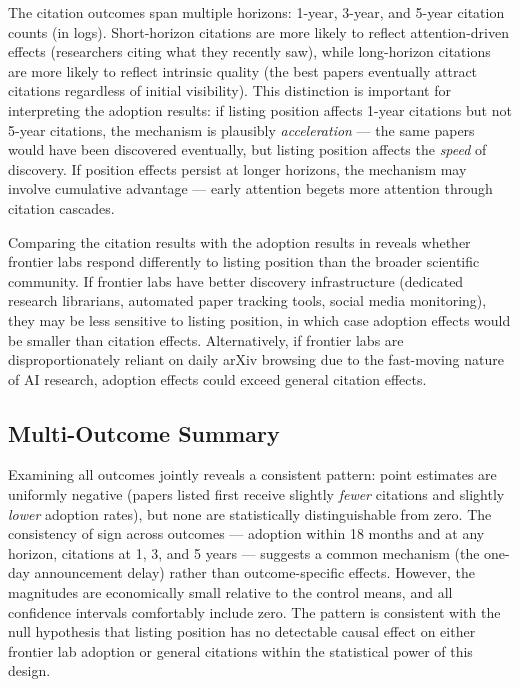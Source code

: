 \documentclass[12pt]{article}
\begin{document}
  


The citation outcomes span multiple horizons: 1-year, 3-year, and 5-year citation counts (in logs). Short-horizon citations are more likely to reflect attention-driven effects (researchers citing what they recently saw), while long-horizon citations are more likely to reflect intrinsic quality (the best papers eventually attract citations regardless of initial visibility). This distinction is important for interpreting the adoption results: if listing position affects 1-year citations but not 5-year citations, the mechanism is plausibly \textit{acceleration} --- the same papers would have been discovered eventually, but listing position affects the \textit{speed} of discovery. If position effects persist at longer horizons, the mechanism may involve cumulative advantage \citep{wang2013, sinatra2016} --- early attention begets more attention through citation cascades.

Comparing the citation results with the adoption results in  reveals whether frontier labs respond differently to listing position than the broader scientific community. If frontier labs have better discovery infrastructure (dedicated research librarians, automated paper tracking tools, social media monitoring), they may be less sensitive to listing position, in which case adoption effects would be smaller than citation effects. Alternatively, if frontier labs are disproportionately reliant on daily arXiv browsing due to the fast-moving nature of AI research, adoption effects could exceed general citation effects.

\subsection{Multi-Outcome Summary}

Examining all outcomes jointly reveals a consistent pattern: point estimates are uniformly negative (papers listed first receive slightly \textit{fewer} citations and slightly \textit{lower} adoption rates), but none are statistically distinguishable from zero. The consistency of sign across outcomes --- adoption within 18 months and at any horizon, citations at 1, 3, and 5 years --- suggests a common mechanism (the one-day announcement delay) rather than outcome-specific effects. However, the magnitudes are economically small relative to the control means, and all confidence intervals comfortably include zero. The pattern is consistent with the null hypothesis that listing position has no detectable causal effect on either frontier lab adoption or general citations within the statistical power of this design.
\end{document}
